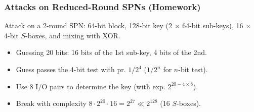 \begin{frame}\frametitle{Attacks on Reduced-Round SPNs (Homework)}
Attack on a 2-round SPN: 64-bit block, 128-bit key (2 $\times$ 64-bit sub-keys), 16 $\times$ 4-bit $S$-boxes, and mixing with XOR.
\begin{figure}
\begin{center}

\end{center}
\end{figure}
\begin{itemize}
\item Guessing 20 bits: 16 bits of the 1st sub-key, 4 bits of the 2nd.
\item Guess passes the 4-bit test with pr. $1/2^4$ ($1/2^n$ for $n$-bit test).
\item Use 8 I/O pairs to determine the key (with exp. $2^{20 - 4\times 8}$).
\item Break with complexity $8\cdot 2^{20} \cdot 16= 2^{27} \ll 2^{128}$ (16 $S$-boxes).
\end{itemize}
\end{frame}
